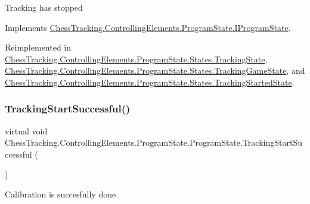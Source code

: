 Tracking has stopped 



Implements \mbox{\hyperlink{interface_chess_tracking_1_1_controlling_elements_1_1_program_state_1_1_i_program_state_aa8c051432b41c20be372d050635d84af}{Chess\+Tracking.\+Controlling\+Elements.\+Program\+State.\+I\+Program\+State}}.



Reimplemented in \mbox{\hyperlink{class_chess_tracking_1_1_controlling_elements_1_1_program_state_1_1_states_1_1_tracking_state_ad0e9790393a45fd5508f871864d09c04}{Chess\+Tracking.\+Controlling\+Elements.\+Program\+State.\+States.\+Tracking\+State}}, \mbox{\hyperlink{class_chess_tracking_1_1_controlling_elements_1_1_program_state_1_1_states_1_1_tracking_game_state_a403e1536e7a40f736bc8d4b2e7c7aed1}{Chess\+Tracking.\+Controlling\+Elements.\+Program\+State.\+States.\+Tracking\+Game\+State}}, and \mbox{\hyperlink{class_chess_tracking_1_1_controlling_elements_1_1_program_state_1_1_states_1_1_tracking_started_state_af5c55ca3a77c8b0d227d688ba3b2fc69}{Chess\+Tracking.\+Controlling\+Elements.\+Program\+State.\+States.\+Tracking\+Started\+State}}.

\mbox{\label{class_chess_tracking_1_1_controlling_elements_1_1_program_state_1_1_program_state_a120f53f07c30eb53b34a7e1de82a4226}} 
\subsubsection{\texorpdfstring{TrackingStartSuccessful()}{TrackingStartSuccessful()}}
{\footnotesize\ttfamily virtual void Chess\+Tracking.\+Controlling\+Elements.\+Program\+State.\+Program\+State.\+Tracking\+Start\+Successful (\begin{DoxyParamCaption}{ }\end{DoxyParamCaption})\hspace{0.3cm}{\ttfamily [virtual]}}



Calibration is succesfully done 



